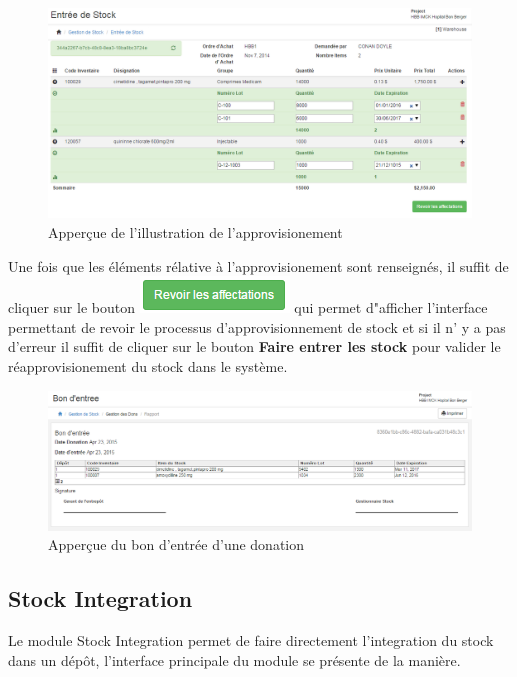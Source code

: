 \documentclass[12pt,a4paper]{report}
\begin{document}
\begin{figure}[h]
\begin{center}
\includegraphics[width=12cm]{pic/AppStockOK.png}
\end{center}
\caption{Apperçue de l'illustration de l'approvisionement}
\label{Apperçue de l'illustration de l'approvisionement}
\end{figure}
\newpage

Une fois que les éléments rélative à l'approvisionement sont renseignés, il suffit de cliquer sur le bouton \includegraphics[scale=0.7]{pic/RevAffectation.png} qui permet d"afficher l'interface permettant de revoir le processus d'approvisionnement de stock et si il n' y a pas d'erreur il suffit de cliquer sur le bouton \textbf{Faire entrer les stock} pour valider le réapprovisionement du stock dans le système.

\begin{figure}[h]
\begin{center}
\includegraphics[width=12cm]{pic/BonEntryDonation.png}
\end{center}
\caption{Apperçue du bon d'entrée d'une donation}
\label{Apperçue du bon d'entrée d'une donation}
\end{figure}


\newpage
\subsection{Stock Integration}
Le module Stock Integration permet de faire directement l'integration du stock dans un dépôt, l'interface principale du module se présente de la manière.
\end{document}
